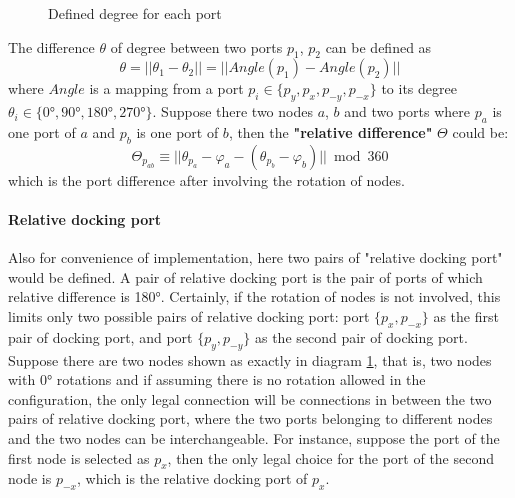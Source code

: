 \par\noindent
\begin{figure}[H]
\begin{center}
\end{center}

\caption{Defined degree for each port}
\label{standardR}
\end{figure}

\par\noindent
The difference $\theta$ of degree between two ports $p_{1}$, $p_{2}$ can be defined as
$$ \theta = ||\theta_{1} - \theta_{2}|| = ||Angle(p_{1}) - Angle(p_{2})||$$
where $Angle$ is a mapping from a port $p_{i} \in \{ p_{y}, p_{x}, p_{-y}, p_{-x}\}$
to its degree $\theta_{i} \in \{\ang{0},\ang{90},\ang{180},\ang{270}\}$.
Suppose there two nodes $a$, $b$ and two ports where $p_{a}$ is
one port of $a$ and $p_{b}$ is one port of $b$, then the \textbf{"relative difference"} $\Theta$ could be:
\begin{equation} \label{Equ_port_differ}
\Theta_{p_{ab}} \equiv ||\theta_{p_{a}} - \varphi_{a} - (\theta_{p_{b}} - \varphi_{b})|| \bmod 360
\end{equation}
which is the port difference after involving the rotation of nodes.

\paragraph{Relative docking port \label{dockerport}}
Also for convenience of implementation, here two pairs of "relative docking port" would
be defined. A pair of relative docking port is the pair of ports of which relative
difference is \ang{180}. Certainly, if the rotation of nodes is not involved, this limits only two possible pairs of
relative docking port: port $\{p_{x}, p_{-x}\}$ as the first pair of docking port,
and port $\{p_{y}, p_{-y}\}$ as the second pair of docking port. Suppose there are
two nodes shown as exactly in diagram \ref{standardR}, that is, two nodes with \ang{0}
rotations and if assuming there is no rotation allowed in the configuration, the only legal connection will
be connections in between the two pairs of relative docking port,
where the two ports belonging to different nodes and the two nodes can be interchangeable.
For instance, suppose the port of the first node is selected as $p_{x}$, then the only legal
choice for the port of the second node is $p_{-x}$, which is the relative docking port of $p_{x}$.


